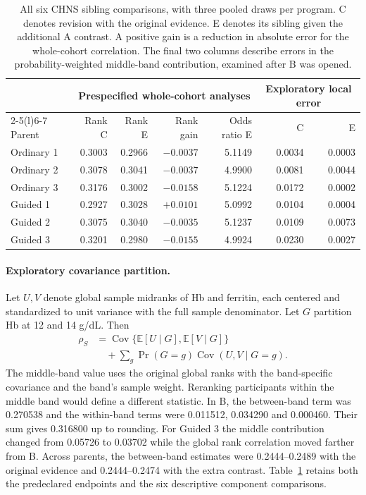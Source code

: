\begin{table}[t]
\caption{All six CHNS sibling comparisons, with three pooled draws per program. C denotes revision with the original evidence. E denotes its sibling given the additional A contrast. A positive gain is a reduction in absolute error for the whole-cohort correlation. The final two columns describe errors in the probability-weighted middle-band contribution, examined after B was opened.}
\label{tab:chns}
\centering
\begin{tabular}{@{}lrrrrrr@{}}
\toprule
 & \multicolumn{4}{c}{Prespecified whole-cohort analyses} & \multicolumn{2}{c}{Exploratory local error}\\
\cmidrule(lr){2-5}\cmidrule(l){6-7}
Parent & Rank C & Rank E & Rank gain & Odds ratio E & C & E\\
\midrule
Ordinary 1 & 0.3003 & 0.2966 & $-0.0037$ & 5.1149 & 0.0034 & 0.0003\\
Ordinary 2 & 0.3078 & 0.3041 & $-0.0037$ & 4.9900 & 0.0081 & 0.0044\\
Ordinary 3 & 0.3176 & 0.3002 & $-0.0158$ & 5.1224 & 0.0172 & 0.0002\\
Guided 1 & 0.2927 & 0.3028 & $+0.0101$ & 5.0992 & 0.0104 & 0.0004\\
Guided 2 & 0.3075 & 0.3040 & $-0.0035$ & 5.1237 & 0.0109 & 0.0073\\
Guided 3 & 0.3201 & 0.2980 & $-0.0155$ & 4.9924 & 0.0230 & 0.0027\\
\bottomrule
\end{tabular}
\end{table}

\paragraph{Exploratory covariance partition.}
Let $U,V$ denote global sample midranks of Hb and ferritin, each centered and standardized to unit variance with the full sample denominator. Let $G$ partition Hb at 12 and 14 g/dL. Then
\begin{align*}
\rho_S
  &= \operatorname{Cov}\{\mathbb E[U\mid G],\mathbb E[V\mid G]\}\\
  &\quad +\sum_g \Pr(G=g)\operatorname{Cov}(U,V\mid G=g).
\end{align*}
The middle-band value uses the original global ranks with the band-specific covariance and the band's sample weight. Reranking participants within the middle band would define a different statistic. In B, the between-band term was 0.270538 and the within-band terms were 0.011512, 0.034290 and 0.000460. Their sum gives 0.316800 up to rounding. For Guided 3 the middle contribution changed from 0.05726 to 0.03702 while the global rank correlation moved farther from B. Across parents, the between-band estimates were 0.2444--0.2489 with the original evidence and 0.2444--0.2474 with the extra contrast. Table~\ref{tab:chns} retains both the predeclared endpoints and the six descriptive component comparisons.

